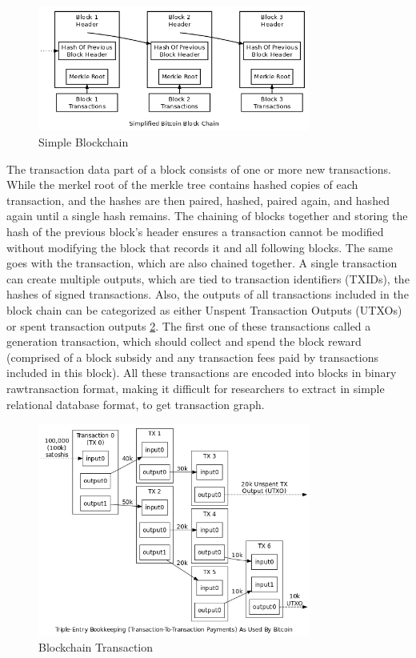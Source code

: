 \begin{figure}[ht]
\begin{center}
\includegraphics[width=0.8\textwidth]{./Figures/blockchain.png}
\caption{Simple Blockchain \citep{Blockchain2016}}
\label{fig:blockchain}
\end{center}
\end{figure}
The transaction data part of a block consists of one or more new transactions. While the merkel root of the merkle tree contains  hashed copies of each transaction, and the hashes are then paired, hashed, paired again, and hashed again until a single hash remains. The chaining of blocks together and storing the hash of the previous block’s header ensures a transaction cannot be modified without modifying the block that records it and all following blocks. The same goes with the transaction, which are also chained together. A single transaction can create multiple outputs, which  are tied to transaction identifiers (TXIDs), the hashes of signed transactions. Also, the outputs of all transactions included in the block chain can be categorized as either Unspent Transaction Outputs (UTXOs) or spent transaction outputs \ref{fig:block_t}. The first one of these transactions called a generation transaction, which should collect and spend the block reward (comprised of a block subsidy and any transaction fees paid by transactions included in this block). All these transactions are encoded into blocks in binary rawtransaction format, making it difficult for researchers to extract in simple relational database format, to get transaction graph.

\begin{figure}[ht]
\begin{center}
\includegraphics[width=0.8\textwidth]{./Figures/block_t.png}
\caption{Blockchain Transaction \citep{Blockchain2016}}
\label{fig:block_t}
\end{center}
\end{figure}

